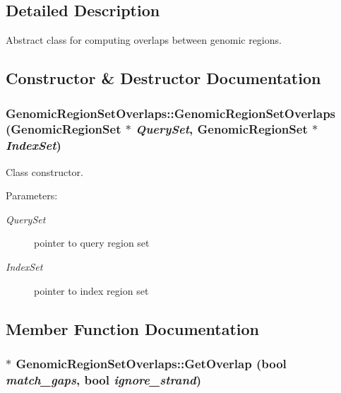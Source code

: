 \subsection{Detailed Description}
Abstract class for computing overlaps between genomic regions. 

\subsection{Constructor \& Destructor Documentation}
\hypertarget{classGenomicRegionSetOverlaps_67c96149c0881747110db61e76f8c5de}{
\subsubsection[GenomicRegionSetOverlaps]{\setlength{\rightskip}{0pt plus 5cm}GenomicRegionSetOverlaps::GenomicRegionSetOverlaps ({\bf GenomicRegionSet} $\ast$ {\em QuerySet}, \/  {\bf GenomicRegionSet} $\ast$ {\em IndexSet})}}
\label{classGenomicRegionSetOverlaps_67c96149c0881747110db61e76f8c5de}


Class constructor. 

\begin{Desc}
\item[Parameters:]
\begin{description}
\item[{\em QuerySet}]pointer to query region set \item[{\em IndexSet}]pointer to index region set \end{description}
\end{Desc}


\subsection{Member Function Documentation}
\hypertarget{classGenomicRegionSetOverlaps_46c3193d39eb61430b0267ca301b226e}{
\subsubsection[GetOverlap]{ $\ast$ GenomicRegionSetOverlaps::GetOverlap (bool {\em match\_\-gaps}, \/  bool {\em ignore\_\-strand})}}
\label{classGenomicRegionSetOverlaps_46c3193d39eb61430b0267ca301b226e}



